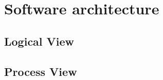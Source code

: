 
\clearpage
\chapter{Software architecture}
\label{ch:softwarearch}

\section{Logical View}
\section{Process View}
